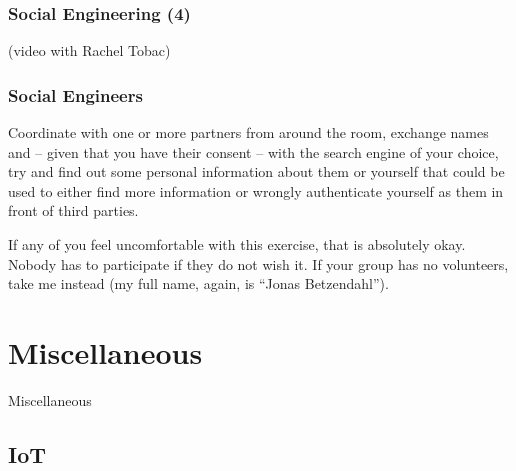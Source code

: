 \documentclass[aspectratio=1610,dvipsnames]{beamer}
\begin{document}
\begin{frame}
\frametitle{Social Engineering (4)}

\begin{center}
(video with Rachel Tobac)
\end{center}
\end{frame}


\begin{frame}
\frametitle{Social Engineers}

Coordinate with one or more partners from around the room, exchange names and -- given that you have their consent -- with the search engine of your choice, try and find out some personal information about them or yourself that could be used to either find more information or wrongly authenticate yourself as them in front of third parties.
\bigskip

If any of you feel uncomfortable with this exercise, that is absolutely okay. Nobody has to participate if they do not wish it. If your group has no volunteers, take me instead (my full name, again, is ``Jonas Betzendahl'').

\end{frame}



\section{Miscellaneous}

\begin{frame}
\begin{center}
\huge Miscellaneous
\end{center}
\end{frame}

\subsection{IoT}
\end{document}
